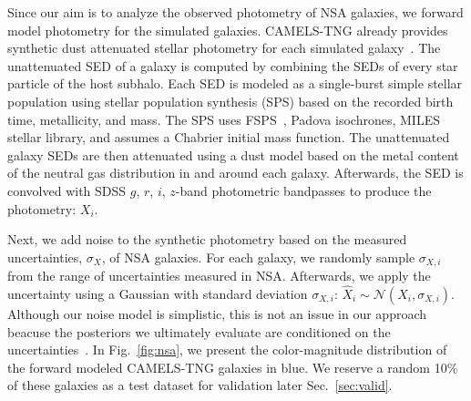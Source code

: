 Since our aim is to analyze the observed photometry of NSA galaxies, we forward
model photometry for the simulated galaxies. 
CAMELS-TNG already provides synthetic dust attenuated stellar photometry for
each simulated galaxy~\citep{nelson2018}.
The unattenuated SED of a galaxy is computed by combining the SEDs of every
star particle of the host subhalo. 
Each SED is modeled as a single-burst simple stellar population using stellar
population synthesis (SPS) based on the recorded birth time, metallicity, and
mass. 
The SPS uses FSPS~\citep{conroy2009}, Padova isochrones, MILES
stellar library, and assumes a Chabrier initial mass function. 
The unattenuated galaxy SEDs are then attenuated using a dust model based on
the metal content of the neutral gas distribution in and around each
galaxy.
Afterwards, the SED is convolved with SDSS $g$, $r$, $i$, $z$-band photometric
bandpasses to produce the photometry: $X_i$. 

Next, we add noise to the synthetic photometry based on the measured
uncertainties, $\sigma_X$, of NSA galaxies. 
For each galaxy, we randomly sample $\sigma_{X,i}$ from the range of
uncertainties measured in NSA. 
Afterwards, we apply the uncertainty using a Gaussian with standard deviation
$\sigma_{X,i}$: $\hat{X}_i \sim \mathcal{N}(X_i, \sigma_{X, i})$. 
Although our noise model is simplistic, this is not an issue in our
approach beacuse the posteriors we ultimately evaluate are conditioned on the
uncertainties~\citep{hahn2022a}. 
In Fig.~\ref{fig:nsa}, we present the color-magnitude distribution of the
forward modeled CAMELS-TNG galaxies in blue. 
We reserve a random 10\% of these galaxies as a test dataset for validation
later Sec.~\ref{sec:valid}.
